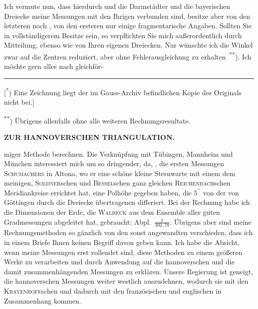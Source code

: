 \par\noindent\hspace*{\parindent}Ich vermute nun, dass hierdurch und die Darmstädter und die bayerischen Dreiecke meine Messungen mit den Ihrigen verbunden sind, besitze aber von den letzteren noch , von den ersteren nur einige fragmentarische Angaben.
Sollten Sie in vollständigerem Besitze sein, so verpflichten Sie mich außerordentlich durch Mitteilung, ebenso wie von Ihren eigenen Dreiecken.
Nur wünschte ich die Winkel zwar auf die Zentren reduziert, aber ohne Fehlerausgleichung zu erhalten~\textsuperscript{**}).
Ich möchte gern alles nach gleichför-
\par\smallskip\noindent\rule{.24\textwidth}{.4pt}\par\smallskip
{\footnotesize
\noindent\hspace*{1.5em}[\textsuperscript{*}) Eine Zeichnung liegt der im Gauss-Archiv befindlichen Kopie des Originals nicht bei.]\par
\noindent\hspace*{1.5em}\textsuperscript{**}) Übrigens allenfalls ohne alle weiteren Rechnungsresultate.\par
}
\clearpage
\noindent\null\hfill{\small\textbf{ZUR HANNOVERSCHEN TRIANGULATION.}}\hfill{}\par\medskip
\noindent miger Methode berechnen.
Die Verknüpfung mit Tübingen, Mannheim und München interessiert mich um so dringender, da, , die ersten Messungen \textsc{Schumachers} in Altona, wo er eine schöne kleine Sternwarte mit einem dem meinigen, \textsc{Soldner}schen und \textsc{Bessel}schen ganz gleichen \textsc{Reichenbach}schen Meridiankreise errichtet hat, eine Polhöhe gegeben haben, die \(5^{\prime\prime}\) von der von Göttingen durch die Dreiecke übertragenen differiert.
Bei der Rechnung habe ich die Dimensionen der Erde, die \textsc{Walbeck} aus dem Ensemble aller guten Gradmessungen abgeleitet hat, gebraucht: Abpl.\ \(\frac{1}{302{,}78}\).
Übrigens aber sind meine Rechnungsmethoden so gänzlich von den sonst angewandten verschieden, dass ich in einem Briefe Ihnen keinen Begriff davon geben kann.
Ich habe die Absicht, wenn meine Messungen erst vollendet sind, diese Methoden zu einem größeren Werke zu verarbeiten und durch Anwendung auf die hannoverschen und die damit zusammenhängenden Messungen zu erklären.
Unsere Regierung ist geneigt, die hannoverschen Messungen weiter westlich auszudehnen, wodurch sie mit den \textsc{Krayenhoff}schen und dadurch mit den französischen und englischen in Zusammenhang kommen.
